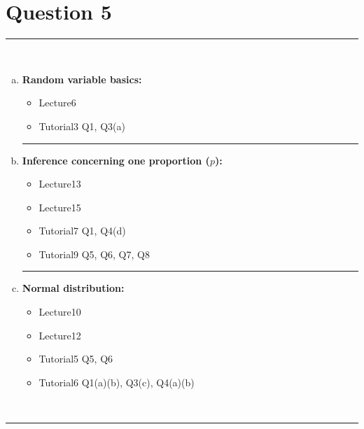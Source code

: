 \documentclass[12pt]{article}
\begin{document}
\section*{Question 5 }
\noindent\rule{\linewidth}{1pt}
\quad\\[-0.5cm]
\begin{enumerate}[a)]
\item {\bf Random variable basics:}
\begin{itemize}
\item Lecture6 %
\item Tutorial3 Q1, Q3(a)
\end{itemize}
\begin{center}\noindent\rule{0.4\linewidth}{0.5pt}\end{center}
\item {\bf Inference concerning one proportion ($p$):}
\begin{itemize}
\item Lecture13
\item Lecture15 %
\item Tutorial7 Q1, Q4(d)
\item Tutorial9 Q5, Q6, Q7, Q8
\end{itemize}
    \begin{center}\noindent\rule{0.4\linewidth}{0.5pt}\end{center}
\item {\bf Normal distribution:}
\begin{itemize}
\item Lecture10 %
\item Lecture12 %
\item Tutorial5 Q5, Q6
\item Tutorial6 Q1(a)(b), Q3(c), Q4(a)(b)
\end{itemize}
\end{enumerate}
\quad\\[-0.3cm]
\noindent\rule{\linewidth}{1pt}

\newpage
\end{document}
